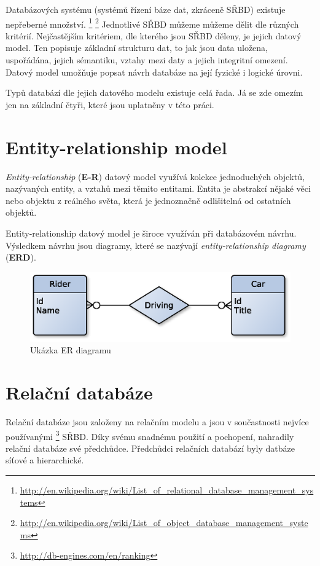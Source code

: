 Databázových systému (systémů řízení báze dat, zkráceně SŘBD) existuje nepřeberné množství.
\footnote{\label{rdbms_list}\url{http://en.wikipedia.org/wiki/List_of_relational_database_management_systems}}
\footnote{\url{http://en.wikipedia.org/wiki/List_of_object_database_management_systems}}
Jednotlivé SŘBD můžeme můžeme dělit dle různých kritérií. Nejčastějším kritériem, dle kterého jsou SŘBD děleny, je jejich datový model.
Ten popisuje základní strukturu dat, to jak jsou data uložena, uspořádána, jejich sémantiku, vztahy mezi daty a jejich integritní omezení. Datový model umožňuje popsat návrh databáze na její fyzické i logické úrovni.\cite[s.~945--964]{korth:dbsc}

Typů databází dle jejich datového modelu existuje celá řada. Já se zde omezím jen na základní čtyři, které jsou uplatněny v této práci.

\section{Entity-relationship model}
\emph{Entity-relationship} (\textbf{E-R}) datový model využívá kolekce jednoduchých objektů, nazývaných entity, a vztahů mezi těmito entitami. Entita je abstrakcí nějaké věci nebo objektu z reálného světa, která je jednoznačně odlišitelná od ostatních objektů. 

Entity-relationship datový model je široce využíván při databázovém návrhu. Výsledkem návrhu jsou diagramy, které se nazývají \emph{entity-relationship diagramy} (\textbf{ERD}).
\begin{figure}[h]
  \begin{center}
    \includegraphics[width=40em]{obr/era}
    \caption{Ukázka ER diagramu}
    \label{fig:era}
  \end{center}
\end{figure}
\section{Relační databáze}
Relační databáze jsou založeny na relačním modelu a jsou v součastnosti nejvíce používanými \footnote{\label{dbms_rank}\url{http://db-engines.com/en/ranking}} SŘBD. Díky svému snadnému použití a pochopení, nahradily relační databáze své předchůdce. Předchůdci relačních databází byly datbáze síťové a hierarchické.

